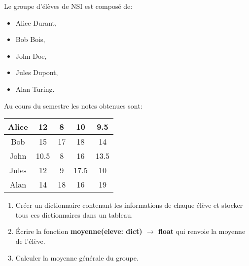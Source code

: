 \documentclass[a4paper,11pt]{article}
\begin{document}
\begin{exo}
    Le groupe d'élèves de NSI est composé de:
    \begin{itemize}
        \item Alice Durant,
        \item Bob Bois,
        \item John Doe,
        \item Jules Dupont,
        \item Alan Turing.
    \end{itemize}
    Au cours du semestre les notes obtenues sont:
    \begin{center}
        \begin{tabular}{|c|*{4}{c}|}
            \hline
            Alice & 12   & 8  & 10   & 9.5  \\
            \hline
            Bob   & 15   & 17 & 18   & 14   \\
            \hline
            John  & 10.5 & 8  & 16   & 13.5 \\
            \hline
            Jules & 12   & 9  & 17.5 & 10   \\
            \hline
            Alan  & 14   & 18 & 16   & 19   \\
            \hline
        \end{tabular}
    \end{center}
    \begin{enumerate}
        \item Créer un dictionnaire contenant les informations de chaque élève et stocker tous ces dictionnaires dans un tableau.
        \item Écrire la fonction \textbf{moyenne(eleve: dict) $\rightarrow$ float} qui renvoie la moyenne de l'élève.
        \item Calculer la moyenne générale du groupe.
    \end{enumerate}
\end{exo}
\end{document}

